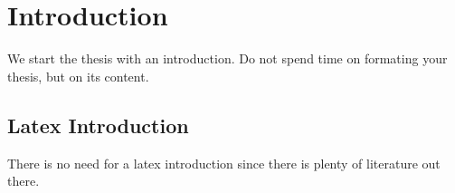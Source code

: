 \chapter{Introduction}
\label{chapter:Introduction}

We start the thesis with an introduction. Do not spend time on formating your thesis, but on its content.
 
\section{Latex Introduction}
There is no need for a latex introduction since there is plenty of literature out there.
